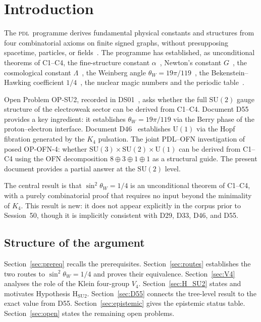 \documentclass[11pt,a4paper]{article}
\newcommand{\Kfour}{K_4}
\newcommand{\sinW}{\sin^2\!\theta_W}
\newcommand{\thetaW}{\theta_W}
\newcommand{\PDL}{\textsc{pdl}}
\begin{document}
\clearpage

\tableofcontents
\newpage

\section{Introduction}
\label{sec:intro}

The \PDL\ programme derives fundamental physical constants and structures from four combinatorial axioms on finite signed graphs, without presupposing spacetime, particles, or fields~\cite{PDL_D01,PDL_D02}. The programme has established, as unconditional theorems of C1--C4, the fine-structure constant $\alpha$~\cite{PDL_D25}, Newton's constant $G$~\cite{PDL_D44}, the cosmological constant $\Lambda$~\cite{PDL_D52}, the Weinberg angle $\thetaW = 19\pi/119$~\cite{PDL_D55}, the Bekenstein--Hawking coefficient $1/4$~\cite{PDL_D50}, the nuclear magic numbers and the periodic table~\cite{PDL_D47}.

Open Problem OP-SU2, recorded in DS01~\cite{PDL_DS01}, asks whether the full $\mathrm{SU}(2)$ gauge structure of the electroweak sector can be derived from C1--C4. Document D55 provides a key ingredient: it establishes $\thetaW = 19\pi/119$ via the Berry phase of the proton--electron interface. Document D46~\cite{PDL_D46} establishes $\mathrm{U}(1)$ via the Hopf fibration generated by the $\Kfour$ pulsation. The joint PDL--OFN investigation of~\cite{PDL_N01} posed OP-OFN-4: whether $\mathrm{SU}(3)\times\mathrm{SU}(2)\times\mathrm{U}(1)$ can be derived from C1--C4 using the OFN decomposition $8\oplus 3\oplus 1\oplus 1$ as a structural guide. The present document provides a partial answer at the $\mathrm{SU}(2)$ level.

The central result is that $\sinW = 1/4$ is an unconditional theorem of C1--C4, with a purely combinatorial proof that requires no input beyond the minimality of $\Kfour$. This result is new: it does not appear explicitly in the corpus prior to Session~50, though it is implicitly consistent with D29, D33, D46, and D55.

\subsection{Structure of the argument}

Section~\ref{sec:prereq} recalls the prerequisites. Section~\ref{sec:routes} establishes the two routes to $\sinW = 1/4$ and proves their equivalence. Section~\ref{sec:V4} analyses the role of the Klein four-group $V_4$. Section~\ref{sec:H_SU2} states and motivates Hypothesis H$_{\mathrm{SU2}}$. Section~\ref{sec:D55} connects the tree-level result to the exact value from D55. Section~\ref{sec:epistemic} gives the epistemic status table. Section~\ref{sec:open} states the remaining open problems.
\end{document}
